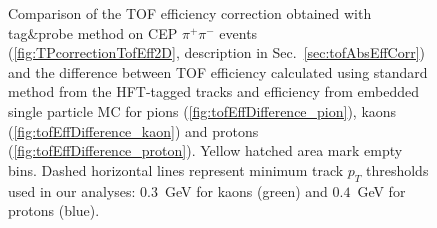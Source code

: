 \begin{figure}[t!]\vspace{-34pt}
\centering
\parbox{0.31\textwidth}{
  \centering
  \begin{subfigure}[b]{\linewidth}{
                }
  \end{subfigure} 
} 
\quad
\parbox{0.65\textwidth}{ 
  \centering
		\begin{minipage}[t][0.64\linewidth][t]{\linewidth}\vspace{73pt}
			\caption[Comparison of the TOF eff. correction from tag\&probe method and the difference between TOF eff. calculated using standard method from the HFT-tagged tracks and efficiency from embedded single particle MC.]%
    {Comparison of the TOF efficiency correction obtained with tag\&probe method on CEP $\pi^{+}\pi^{-}$ events (\ref{fig:TPcorrectionTofEff2D}, description in Sec.~\ref{sec:tofAbsEffCorr}) and the difference between TOF efficiency calculated using standard method from the HFT-tagged tracks and efficiency from embedded single particle MC for pions (\ref{fig:tofEffDifference_pion}), kaons (\ref{fig:tofEffDifference_kaon}) and protons (\ref{fig:tofEffDifference_proton}). Yellow hatched area mark empty bins. Dashed horizontal lines represent minimum track $p_{T}$ thresholds used in our analyses: $0.3$~GeV for kaons (green) and $0.4$~GeV for protons (blue).}\label{fig:tofEffSystematics2DComparison}%
		\end{minipage}
}
\end{figure}
